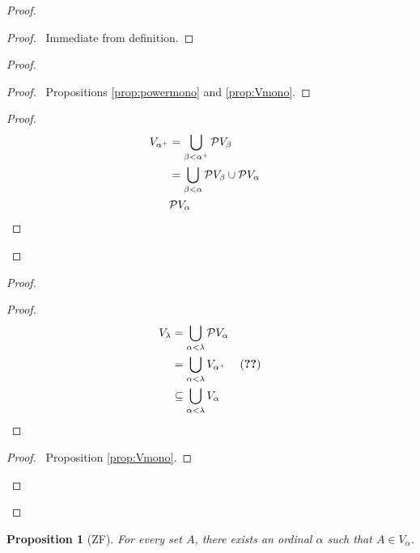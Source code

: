 \documentclass{book}
\let\qed\relax
\newtheorem{prop}[ax]{Proposition}
\theoremstyle{definition}
\begin{document}
\begin{proof}
\pf
{}
\begin{proof}
	\pf\ Immediate from definition.
\end{proof}
\begin{proof}
	\pf
	\begin{proof}
		\pf\ Propositions \ref{prop:powermono} and \ref{prop:Vmono}.
	\end{proof}
	\begin{proof}
	\begin{align*}
		V_{\alpha^+} & = \bigcup_{\beta < \alpha^+} \mathcal{P} V_\beta \\
		& = \bigcup_{\beta < \alpha} \mathcal{P} V_\beta \cup \mathcal{P} V_\alpha \\
		& \mathcal{P} V_\alpha & \qed
	\end{align*}
	\end{proof}
\end{proof}
\begin{proof}
	\pf
	\begin{proof}
	\pf
	\begin{align*}
		V_\lambda & = \bigcup_{\alpha < \lambda} \mathcal{P} V_\alpha \\
		& = \bigcup_{\alpha < \lambda} V_{\alpha^+} & (\text{\stepref{2}}) \\
		& \subseteq \bigcup_{\alpha < \lambda} V_\alpha
	\end{align*}
	\end{proof}
	\begin{proof}
		\pf\ Proposition \ref{prop:Vmono}.
	\end{proof}
\end{proof}
\qed
\end{proof}

\begin{prop}[ZF]
For every set $A$, there exists an ordinal $\alpha$ such that $A \in V_\alpha$.
\end{prop}
\end{document}
